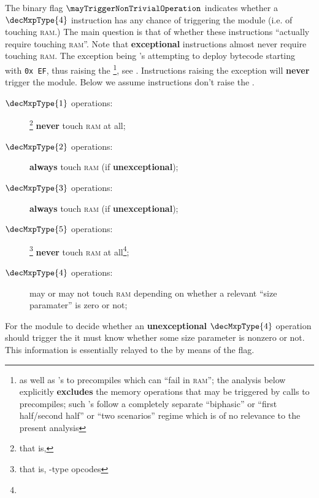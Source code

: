 The binary flag $\mayTriggerNonTrivialOperation$ indicates whether a $\decMxpType{4}$ instruction has any chance of triggering the \mmuMod{} module (i.e. of touching \textsc{ram}.)
The main question is that of whether these instructions ``actually require touching \textsc{ram}''.
Note that \textbf{exceptional} instructions almost never require touching \textsc{ram}.
The exception being 's attempting to deploy bytecode starting with \texttt{0x\,EF},
thus raising the \icpxSH{}\footnote{as well as
's to precompiles which can ``fail in \textsc{ram}'';
the analysis below explicitly \textbf{excludes} the memory operations that may be triggered by calls to precompiles;
such 's follow a completely separate ``biphasic'' or ``first half/second half'' or ``two scenarios'' regime which is of no relevance to the present analysis},
see \cite{EIP-3541}.
Instructions raising the \mxpxSH{} exception will \textbf{never} trigger the \mmuMod{} module.
Below we assume instructions don't raise the \mxpxSH{}.
\begin{description}
    \item[$\decMxpType{1}$ operations:]\footnote{that is, }
        \textbf{never} touch \textsc{ram} at all;
    \item[$\decMxpType{2}$ operations:]
        \textbf{always} touch \textsc{ram} (if \textbf{unexceptional});
    \item[$\decMxpType{3}$ operations:]
        \textbf{always} touch \textsc{ram} (if \textbf{unexceptional});
    \item[$\decMxpType{5}$ operations:]\footnote{that is, -type opcodes}
        \textbf{never} touch \textsc{ram} at all\footnote{};
    \item[$\decMxpType{4}$ operations:] may or may not touch \textsc{ram} depending on whether a relevant ``size paramater'' is zero or not;
\end{description}
For the \hubMod{} module to decide whether an \textbf{unexceptional} $\decMxpType{4}$ operation should trigger the \mmuMod{} it must know whether some size parameter is nonzero or not.
This information is essentially relayed to the \hubMod{} by means of the \mayTriggerNonTrivialOperation{} flag.

